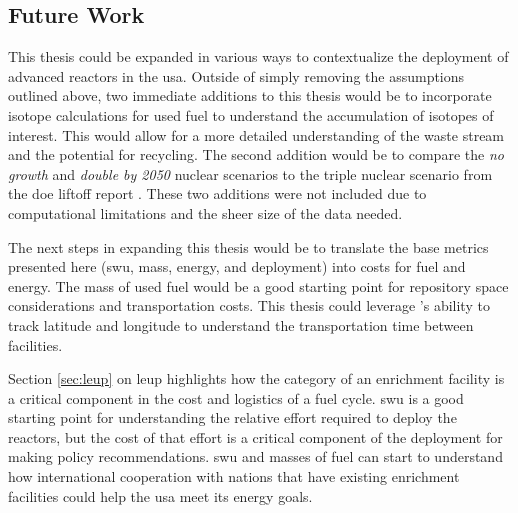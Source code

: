 


\subsection{Future Work}
\label{sec:future_work}

This thesis could be expanded in various ways to contextualize the deployment of advanced reactors in the \gls{usa}. Outside of simply removing the assumptions outlined above, two immediate additions to this thesis would be to incorporate isotope calculations for used fuel to understand the accumulation of isotopes of interest. This would allow for a more detailed understanding of the waste stream and the potential for recycling. The second addition would be to compare the \textit{no growth} and \textit{double by 2050} nuclear scenarios to the triple nuclear scenario from the \gls{doe} liftoff report \cite{julie_liftoff_pathways_2024}. These two additions were not included due to computational limitations and the sheer size of the data needed.

The next steps in expanding this thesis would be to translate the base metrics presented here (\gls{swu}, mass, energy, and deployment) into costs for fuel and energy. The mass of used fuel would be a good starting point for repository space considerations and transportation costs. This thesis could leverage \cyclus's ability to track latitude and longitude to understand the transportation time between facilities.

Section \ref{sec:leup} on \gls{leup} highlights how the category of an enrichment facility is a critical component in the cost and logistics of a fuel cycle. \gls{swu} is a good starting point for understanding the relative effort required to deploy the reactors, but the cost of that effort is a critical component of the deployment for making policy recommendations. \gls{swu} and masses of fuel can start to understand how international cooperation with nations that have existing enrichment facilities could help the \gls{usa} meet its energy goals.

